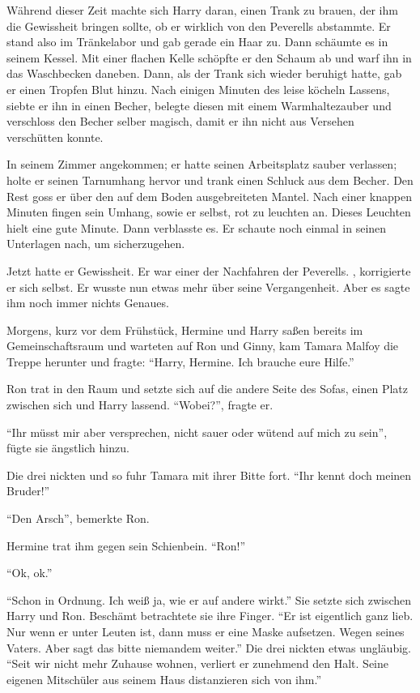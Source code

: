 Während dieser Zeit machte sich Harry daran, einen Trank zu brauen, der ihm die Gewissheit bringen sollte, ob er wirklich von den Peverells abstammte. Er stand also im Tränkelabor und gab gerade ein Haar zu. Dann schäumte es in seinem Kessel. Mit einer flachen Kelle schöpfte er den Schaum ab und warf ihn in das Waschbecken daneben. Dann, als der Trank sich wieder beruhigt hatte, gab er einen Tropfen Blut hinzu. Nach einigen Minuten des leise köcheln Lassens, siebte er ihn in einen Becher, belegte diesen mit einem Warmhaltezauber und verschloss den Becher selber magisch, damit er ihn nicht aus Versehen verschütten konnte.

In seinem Zimmer angekommen; er hatte seinen Arbeitsplatz sauber verlassen; holte er seinen Tarnumhang hervor und trank einen Schluck aus dem Becher. Den Rest goss er über den auf dem Boden ausgebreiteten Mantel. Nach einer knappen Minuten fingen sein Umhang, sowie er selbst, rot zu leuchten an. Dieses Leuchten hielt eine gute Minute. Dann verblasste es. Er schaute noch einmal in seinen Unterlagen nach, um sicherzugehen.

Jetzt hatte er Gewissheit. Er war einer der Nachfahren der Peverells. , korrigierte er sich selbst.  Er wusste nun etwas mehr über seine Vergangenheit. Aber es sagte ihm noch immer nichts Genaues.

\trenn

Morgens, kurz vor dem Frühstück, Hermine und Harry saßen bereits im Gemeinschaftsraum und warteten auf Ron und Ginny, kam Tamara Malfoy die Treppe herunter und fragte: \enquote{Harry, Hermine. Ich brauche eure Hilfe.}

Ron trat in den Raum und setzte sich auf die andere Seite des Sofas, einen Platz zwischen sich und Harry lassend. \enquote{Wobei?}, fragte er.

\enquote{Ihr müsst mir aber versprechen, nicht sauer oder wütend auf mich zu sein}, fügte sie ängstlich hinzu.

Die drei nickten und so fuhr Tamara mit ihrer Bitte fort. \enquote{Ihr kennt doch meinen Bruder!}

\enquote{Den Arsch}, bemerkte Ron.

Hermine trat ihm gegen sein Schienbein. \enquote{Ron!}

\enquote{Ok, ok.}

\enquote{Schon in Ordnung. Ich weiß ja, wie er auf andere wirkt.} Sie setzte sich zwischen Harry und Ron. Beschämt betrachtete sie ihre Finger. \enquote{Er ist eigentlich ganz lieb. Nur wenn er unter Leuten ist, dann muss er eine Maske aufsetzen. Wegen seines Vaters. Aber sagt das bitte niemandem weiter.} Die drei nickten etwas ungläubig. \enquote{Seit wir nicht mehr Zuhause wohnen, verliert er zunehmend den Halt. Seine eigenen Mitschüler aus seinem Haus distanzieren sich von ihm.}

